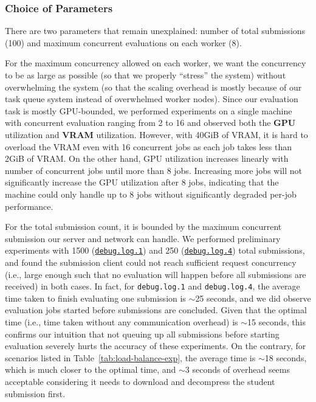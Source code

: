 \subsubsection{Choice of Parameters}
\label{sss:choice-of-params}

There are two parameters that remain unexplained: number of total submissions (100) and maximum concurrent evaluations on each worker (8).

For the maximum concurrency allowed on each worker, we want the concurrency to be as large as possible (so that we properly ``stress'' the system) without overwhelming the system (so that the scaling overhead is mostly because of our task queue system instead of overwhelmed worker nodes). Since our evaluation task is mostly GPU-bounded, we performed experiments on a single machine with concurrent evaluation ranging from 2 to 16 and observed both the \textbf{GPU} utilization and \textbf{VRAM} utilization. However, with 40GiB of VRAM, it is hard to overload the VRAM even with 16 concurrent jobs as each job takes less than 2GiB of VRAM. On the other hand, GPU utilization increases linearly with number of concurrent jobs until more than 8 jobs. Increasing more jobs will not significantly increase the GPU utilization after 8 jobs, indicating that the machine could only handle up to 8 jobs without significantly degraded per-job performance.

For the total submission count, it is bounded by the maximum concurrent submission our server and network can handle. We performed preliminary experiments with 1500 (\href{https://github.com/edu-ai/aivle-experiment-logs/blob/main/web/debug.log.1}{\texttt{debug.log.1}}) and 250 (\href{https://github.com/edu-ai/aivle-experiment-logs/blob/main/web/debug.log.4}{\texttt{debug.log.4}}) total submissions, and found the submission client could not reach sufficient request concurrency (i.e., large enough such that no evaluation will happen before all submissions are received) in both cases. In fact, for \texttt{debug.log.1} and \texttt{debug.log.4}, the average time taken to finish evaluating one submission is $\sim$25 seconds, and we did observe evaluation jobs started before submissions are concluded. Given that the optimal time (i.e., time taken without any communication overhead) is $\sim$15 seconds, this confirms our intuition that not queuing up all submissions before starting evaluation severely hurts the accuracy of these experiments. On the contrary, for scenarios listed in Table~\ref{tab:load-balance-exp}, the average time is $\sim$18 seconds, which is much closer to the optimal time, and $\sim$3 seconds of overhead seems acceptable considering it needs to download and decompress the student submission first.

